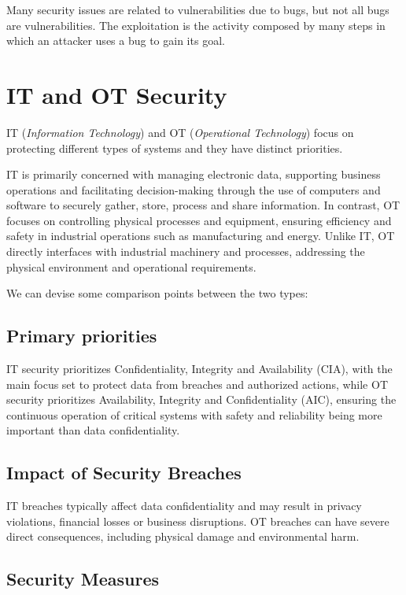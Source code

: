 Many security issues are related to vulnerabilities due to bugs, but not all bugs are vulnerabilities. The exploitation is the activity composed by many steps in which an attacker uses a bug to gain its goal.

\section{IT and OT Security}

IT (\textit{Information Technology}) and OT (\textit{Operational Technology}) focus on protecting different types of systems and they have distinct priorities.

IT is primarily concerned with managing electronic data, supporting business operations and facilitating decision-making through the use of computers and software to securely gather, store, process and share information. In contrast, OT focuses on controlling physical processes and equipment, ensuring efficiency and safety in industrial operations such as manufacturing and energy. Unlike IT, OT directly interfaces with industrial machinery and processes, addressing the physical environment and operational requirements.~\cite{paloalto-it-ot-diff}

We can devise some comparison points between the two types:
\subsection{Primary priorities}

IT security prioritizes Confidentiality, Integrity and Availability (CIA), with the main focus set to protect data from breaches and authorized actions, while OT security prioritizes Availability, Integrity and Confidentiality (AIC), ensuring the continuous operation of critical systems with safety and reliability being more important than data confidentiality.

\subsection{Impact of Security Breaches}

IT breaches typically affect data confidentiality and may result in privacy violations, financial losses or business disruptions. OT breaches can have severe direct consequences, including physical damage and environmental harm.

\subsection{Security Measures}

